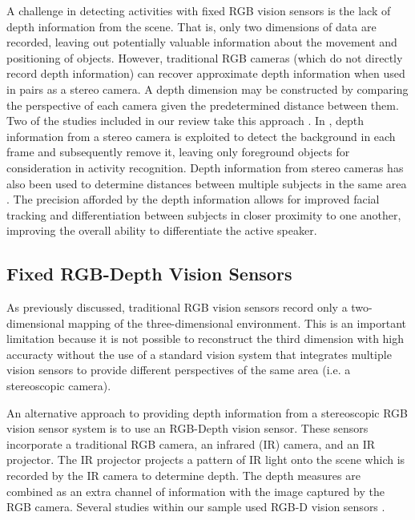 \documentclass[12pt]{report}
\begin{document}
A challenge in detecting activities with fixed RGB vision sensors is the lack of depth information from the scene. That is, only two dimensions of data are recorded, leaving out potentially valuable information about the movement and positioning of objects. However, traditional RGB cameras (which do not directly record depth information) can recover approximate depth information when used in pairs as a stereo camera. A depth dimension may be constructed by comparing the perspective of each camera given the predetermined distance between them. Two of the studies included in our review take this approach \cite{Lim2009, Bloisi2009}. In \cite{Bloisi2009}, depth information from a stereo camera is exploited to detect the background in each frame and subsequently remove it, leaving only foreground objects for consideration in activity recognition. Depth information from stereo cameras has also been used to determine distances between multiple subjects in the same area \cite{Lim2009}. The precision afforded by the depth information allows for improved facial tracking and differentiation between subjects in closer proximity to one another, improving the overall ability to differentiate the active speaker.

\subsection{Fixed RGB-Depth Vision Sensors}

As previously discussed, traditional RGB vision sensors record only a two-dimensional mapping of the three-dimensional environment. This is an important limitation because it is not possible to reconstruct the third dimension with high accuracty without the use of a standard vision system that integrates multiple vision sensors to provide different perspectives of the same area (i.e. a stereoscopic camera).

An alternative approach to providing depth information from a stereoscopic RGB vision sensor system is to use an RGB-Depth vision sensor. These sensors incorporate a traditional RGB camera, an infrared (IR) camera, and an IR projector. The IR projector projects a pattern of IR light onto the scene which is recorded by the IR camera to determine depth. The depth measures are combined as an extra channel of information with the image captured by the RGB camera. Several studies within our sample used RGB-D vision sensors \cite{Banerjee2014, Yao2016, Akbari2017, Zhao2017, Figueroa-Angulo2013, Ong2013}.
\end{document}
